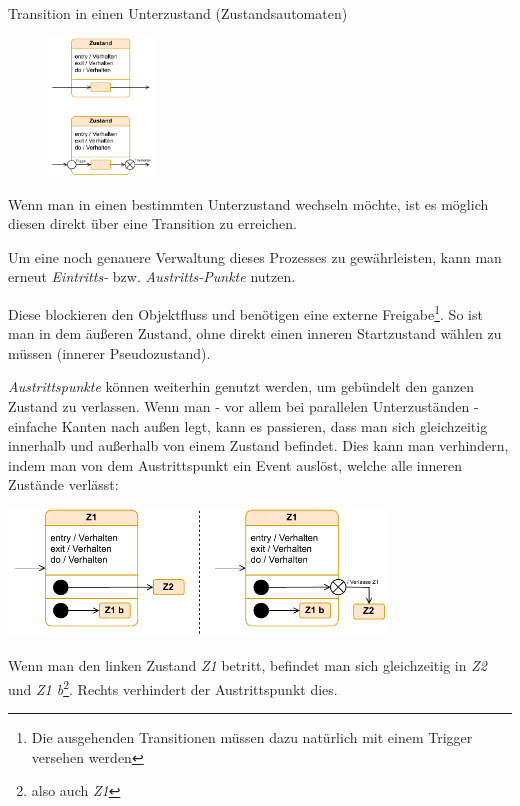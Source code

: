 \begin{bonus}{Transition in einen Unterzustand (Zustandsautomaten)}
    \begin{figure}
        \centering
        \includegraphics[width=0.25\textwidth]{includes/figures/bonus_diagrams_state_insert.pdf}
    \end{figure}
    Wenn man in einen bestimmten Unterzustand wechseln möchte, ist es möglich diesen direkt über eine Transition zu erreichen.

    Um eine noch genauere Verwaltung dieses Prozesses zu gewährleisten, kann man erneut \emph{Eintritts-} bzw. \emph{Austritts-Punkte} nutzen.

    Diese blockieren den Objektfluss und benötigen eine externe Freigabe\footnote{Die ausgehenden Transitionen müssen dazu natürlich mit einem Trigger versehen werden}.
    So ist man in dem äußeren Zustand, ohne direkt einen inneren Startzustand wählen zu müssen (innerer Pseudozustand).

    \emph{Austrittspunkte} können weiterhin genutzt werden, um gebündelt den ganzen Zustand zu verlassen.
    Wenn man - vor allem bei parallelen Unterzuständen - einfache Kanten nach außen legt, kann es passieren, dass man sich gleichzeitig innerhalb und außerhalb von einem Zustand befindet.
    Dies kann man verhindern, indem man von dem Austrittspunkt ein Event auslöst, welche alle inneren Zustände verlässt:

    \begin{center}
        \includegraphics[width=0.75\textwidth]{includes/figures/bonus_diagrams_state_exit.pdf}
    \end{center}
    Wenn man den linken Zustand \emph{Z1} betritt, befindet man sich gleichzeitig in \emph{Z2} und \emph{Z1 b}\footnote{also auch \emph{Z1}}.
    Rechts verhindert der Austrittspunkt dies.
\end{bonus}

